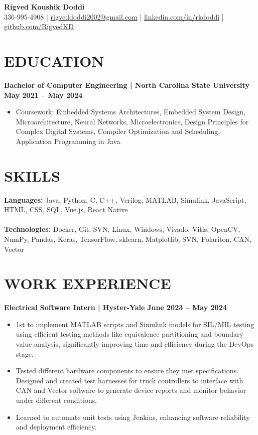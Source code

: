 \documentclass[letterpaper,9pt]{article}
\begin{document}
\begin{center}
    {\Large \textbf{Rigved Koushik Doddi}}\\
    \vspace{1pt}
    \normalsize 336-995-4908 | \href{mailto:rigveddoddi2002@gmail.com}{rigveddoddi2002@gmail.com} | \href{https://www.linkedin.com/in/rkdoddi/}{linkedin.com/in/rkdoddi} | \href{https://github.com/RigvedKD}{github.com/RigvedKD}\\
\end{center}

\section*{EDUCATION}
\noindent \textbf{Bachelor of Computer Engineering | North Carolina State University} \hfill \textbf{May 2021 – May 2024}
\begin{itemize}[leftmargin=*,itemsep=0pt,topsep=0pt]
    \item Coursework: Embedded Systems Architectures, Embedded System Design, Microarchitecture, Neural Networks, Microelectronics, Design Principles for Complex Digital Systems, Compiler Optimization and Scheduling, Application Programming in Java
\end{itemize}

\section*{SKILLS}
\noindent \textbf{Languages:} Java, Python, C, C++, Verilog, MATLAB, Simulink, JavaScript, HTML, CSS, SQL, Vue.js, React Native \\\\
\noindent \textbf{Technologies:} Docker, Git, SVN, Linux, Windows, Vivado, Vitis, OpenCV, NumPy, Pandas, Keras, TensorFlow, sklearn, Matplotlib, SVN, Polariton, CAN, Vector

\section*{WORK EXPERIENCE}
\noindent \textbf{Electrical Software Intern | Hyster-Yale}  \hfill \textbf{June 2023 – May 2024}
\begin{itemize}[leftmargin=*,itemsep=0pt,topsep=0pt]
\item 1st to implement MATLAB scripts and Simulink models for SIL/MIL testing using efficient testing methods like equivalence partitioning and boundary value analysis, significantly improving time and efficiency during the DevOps stage.
\item Tested different hardware components to ensure they met specifications. Designed and created test harnesses for truck controllers to interface with CAN and Vector software to generate device reports and monitor behavior under different conditions.
\item Learned to automate unit tests using Jenkins, enhancing software reliability and deployment efficiency.
\end{itemize}
\end{document}
